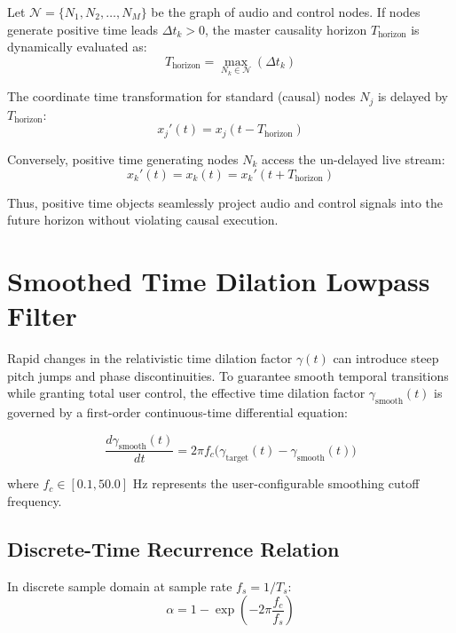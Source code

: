 \documentclass[11pt,a4paper]{article}
\begin{document}
Let $\mathcal{N} = \{N_1, N_2, \dots, N_M\}$ be the graph of audio and control nodes. If nodes generate positive time leads $\Delta t_k > 0$, the master causality horizon $T_{\text{horizon}}$ is dynamically evaluated as:
\begin{equation}
T_{\text{horizon}} = \max_{N_k \in \mathcal{N}} (\Delta t_k)
\end{equation}

The coordinate time transformation for standard (causal) nodes $N_j$ is delayed by $T_{\text{horizon}}$:
\begin{equation}
x_j'(t) = x_j(t - T_{\text{horizon}})
\end{equation}

Conversely, positive time generating nodes $N_k$ access the un-delayed live stream:
\begin{equation}
x_k'(t) = x_k(t) = x_k'(t + T_{\text{horizon}})
\end{equation}

Thus, positive time objects seamlessly project audio and control signals into the future horizon without violating causal execution.

\section{Smoothed Time Dilation Lowpass Filter}

Rapid changes in the relativistic time dilation factor $\gamma(t)$ can introduce steep pitch jumps and phase discontinuities. To guarantee smooth temporal transitions while granting total user control, the effective time dilation factor $\gamma_{\text{smooth}}(t)$ is governed by a first-order continuous-time differential equation:

\begin{equation}
\frac{d \gamma_{\text{smooth}}(t)}{dt} = 2\pi f_c \Big( \gamma_{\text{target}}(t) - \gamma_{\text{smooth}}(t) \Big)
\end{equation}

where $f_c \in [0.1, 50.0] \text{ Hz}$ represents the user-configurable smoothing cutoff frequency.

\subsection{Discrete-Time Recurrence Relation}
In discrete sample domain at sample rate $f_s = 1 / T_s$:
\begin{equation}
\alpha = 1 - \exp\left( -2\pi \frac{f_c}{f_s} \right)
\end{equation}
\end{document}
